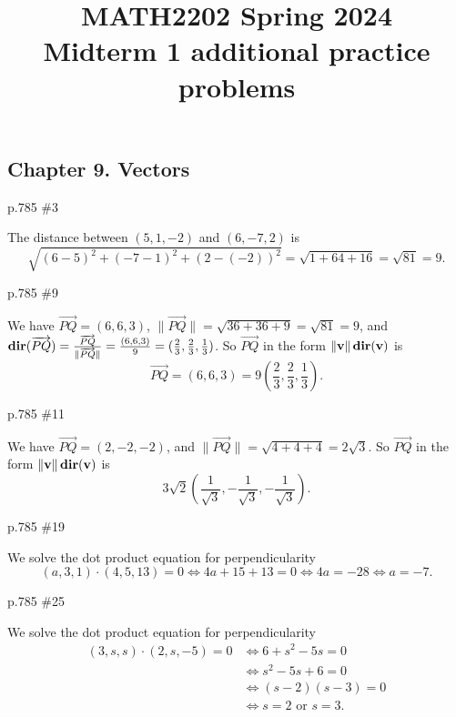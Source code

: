 \documentclass[11pt,oneside]{amsart}
\title{MATH2202 Spring 2024\\
Midterm 1 additional practice problems}
\theoremstyle{definition}
\begin{document}
\maketitle

\subsection*{Chapter 9. Vectors}
\begin{practice}p.785 \#3\end{practice}
\begin{pracsol}
  The distance between $(5,1,-2)$ and $(6,-7,2)$ is
  \[\sqrt{(6-5)^2+(-7-1)^2+(2-(-2))^2}=\sqrt{1+64+16}=\sqrt{81}=9.\]
\end{pracsol}
\begin{practice}p.785 \#9\end{practice}
\begin{pracsol}
  We have $\overrightarrow{PQ}=(6,6,3)$, $\|\overrightarrow{PQ}\|=\sqrt{36+36+9}=\sqrt{81}=9$, and $\operatorname{\mathbf{dir}}(\overrightarrow{PQ})=\frac{\overrightarrow{PQ}}{\|\overrightarrow{PQ}\|}=\frac{(6,6,3)}9=(\frac23,\frac23,\frac13)$. So $\overrightarrow{PQ}$ in the form $\|\mathbf v\|\operatorname{\mathbf{dir}}(\mathbf v)$ is
  \[\overrightarrow{PQ}=(6,6,3)=9\left(\frac23,\frac23,\frac13\right).\]
\end{pracsol}
\begin{practice}p.785 \#11\end{practice}
\begin{pracsol}
  We have $\overrightarrow{PQ}=(2,-2,-2)$, and $\|\overrightarrow{PQ}\|=\sqrt{4+4+4}=2\sqrt3$. So $\overrightarrow{PQ}$ in the form $\|\mathbf v\|\operatorname{\mathbf{dir}}(\mathbf v)$ is
  \[3\sqrt2\left(\frac 1{\sqrt3},-\frac 1{\sqrt3},-\frac 1{\sqrt3}\right).\]
\end{pracsol}
\begin{practice}p.785 \#19\end{practice}
\begin{pracsol}
  We solve the dot product equation for perpendicularity
  \[(a,3,1)\cdot(4,5,13)=0\iff 4a+15+13=0\iff 4a=-28\iff a=-7.\]
\end{pracsol}
\begin{practice}p.785 \#25\end{practice}
\begin{pracsol}
  We solve the dot product equation for perpendicularity
  \[\begin{split}
    (3,s,s)\cdot(2,s,-5)=0 &\iff 6+s^2-5s=0\\
    &\iff s^2-5s+6=0 \\
    &\iff (s-2)(s-3)=0 \\
    &\iff s=2\text{ or }s=3.
  \end{split}\]
\end{pracsol}
\end{document}
